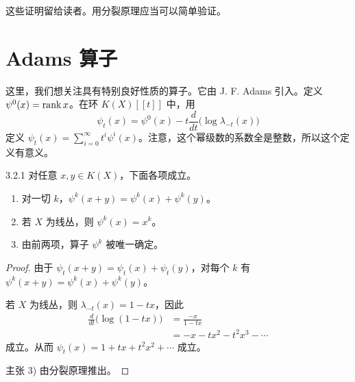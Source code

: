 这些证明留给读者。用分裂原理应当可以简单验证。

\section{Adams 算子}

这里，我们想关注具有特别良好性质的算子。它由 J. F. Adams 引入。定义 $\psi^0(x)=\operatorname{rank} x$。在环 $K(X)[[t]]$ 中，用
\[
\psi_t(x)=\psi^0(x)-t\frac{d}{dt}\bigl(\log\lambda_{-t}(x)\bigr)
\]
定义 $\psi_t(x)=\sum_{i=0}^{\infty}t^i\psi^i(x)$。注意，这个幂级数的系数全是整数，所以这个定义有意义。


\begin{proposition*}{3.2.1}
对任意 $x,y\in K(X)$，下面各项成立。
\begin{enumerate}[label=\arabic*),leftmargin=2.2em,itemsep=2pt]
\item 对一切 $k$，$\psi^k(x+y)=\psi^k(x)+\psi^k(y)$。
\item 若 $X$ 为线丛，则 $\psi^k(x)=x^k$。
\item 由前两项，算子 $\psi^k$ 被唯一确定。
\end{enumerate}
\end{proposition*}


\begin{proof}
由于 $\psi_t(x+y)=\psi_t(x)+\psi_t(y)$，对每个 $k$ 有 $\psi^k(x+y)=\psi^k(x)+\psi^k(y)$。

若 $X$ 为线丛，则 $\lambda_{-t}(x)=1-tx$，因此
\begin{align*}
\frac{d}{dt}\bigl(\log(1-tx)\bigr)&=\frac{-x}{1-tx}\\
&=-x-tx^2-t^2x^3-\cdots
\end{align*}
成立。从而 $\psi_t(x)=1+tx+t^2x^2+\cdots$ 成立。

主张 3) 由分裂原理推出。
\end{proof}

